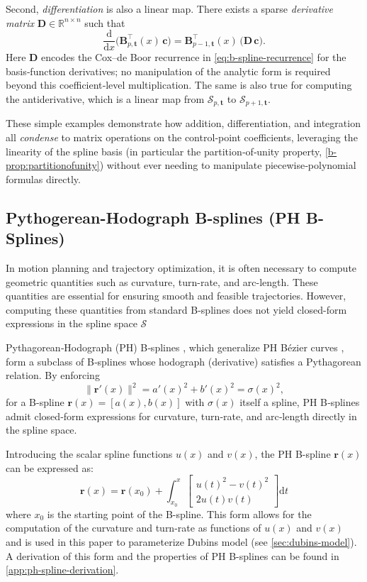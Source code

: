 Second, \emph{differentiation} is also a linear map.  There exists a sparse \emph{derivative matrix} $\mathbf{D}\in\mathbb R^{n\times n}$ such that
\begin{equation}
  \frac{\mathrm{d}}{\mathrm{d}x}\bigl(\mathbf{B}_{p,\mathbf{t}}^\top(x)\,\mathbf{c}\bigr)
  = \mathbf{B}_{p-1,\mathbf{t}}^\top(x)\,\bigl(\mathbf{D}\,\mathbf{c}\bigr).
\end{equation}
Here $\mathbf{D}$ encodes the Cox–de Boor recurrence in \cref{eq:b-spline-recurrence} for the basis‐function derivatives; no manipulation of the analytic form is required beyond this coefficient‐level multiplication. The same is also true for computing the antiderivative, which is a linear map from $\mathcal{S}_{p,\mathbf{t}}$ to $\mathcal{S}_{p+1,\mathbf{t}}$.

These simple examples demonstrate how addition, differentiation, and integration all \emph{condense} to matrix operations on the control‐point coefficients, leveraging the linearity of the spline basis (in particular the partition‐of‐unity property, \cref{b-prop:partitionofunity}) without ever needing to manipulate piecewise‐polynomial formulas directly.


\subsection{Pythogerean-Hodograph B-splines (PH B-Splines)}\label{sec:pythogerean-hodograph}
In motion planning and trajectory optimization, it is often necessary to compute geometric quantities such as curvature, turn-rate, and arc-length. These quantities are essential for ensuring smooth and feasible trajectories. However, computing these quantities from standard B-splines does not yield closed-form expressions in the spline space $\mathcal S$ 

Pythagorean‐Hodograph (PH) B‐splines \citep{Albrecht2016}, which generalize PH Bézier curves \citep{Farouki1990}, form a subclass of B‐splines whose hodograph (derivative) satisfies a Pythagorean relation.  By enforcing 
\[
  \|\mathbf r'(x)\|^2 = a'(x)^2 + b'(x)^2 = \sigma(x)^2,
\]
for a B-spline $\mathbf r(x) = [a(x), b(x)]$ with \(\sigma(x)\) itself a spline, PH B‐splines admit closed‐form expressions for curvature, turn‐rate, and arc‐length directly in the spline space.  

Introducing the scalar spline functions $u(x)$ and $v(x)$, the PH B-spline $\mathbf r(x)$ can be expressed as:
\begin{equation}\label{eq:ph-b-spline}
    \mathbf r(x) = \mathbf r(x_0) + \int_{x_0}^x 
    \begin{bmatrix}
        u(t)^2 - v(t)^2 \\
        2u(t)v(t)
    \end{bmatrix} \mathrm{d}t
\end{equation}
where $x_0$ is the starting point of the B-spline. This form allows for the computation of the curvature and turn-rate as functions of $u(x)$ and $v(x)$ and is used in this paper to parameterize Dubins model (see \cref{sec:dubins-model}). A derivation of this form and the properties of PH B-splines can be found in \cref{app:ph-spline-derivation}.

